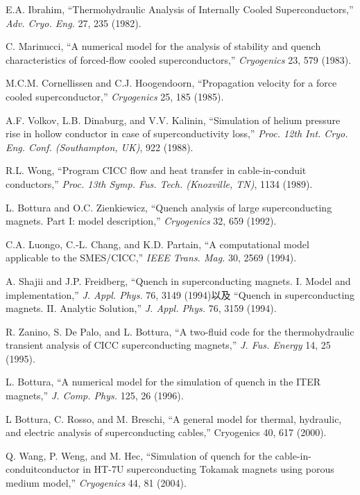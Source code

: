 \noindent [1.9] E.A. Ibrahim, ``Thermohydraulic Analysis of Internally Cooled Superconductors,”
\textit{Adv. Cryo. Eng.} 27, 235 (1982).

\noindent [1.10] C. Marinucci, ``A numerical model for the analysis of stability and quench characteristics of forced-flow cooled superconductors,” \textit{Cryogenics} 23, 579 (1983).

\noindent [1.11] M.C.M. Cornellissen and C.J. Hoogendoorn, ``Propagation velocity for a force
cooled superconductor,” \textit{Cryogenics} 25, 185 (1985).

\noindent [1.12] A.F. Volkov, L.B. Dinaburg, and V.V. Kalinin, ``Simulation of helium pressure
rise in hollow conductor in case of superconductivity loss,” \textit{Proc. 12th Int. Cryo.
Eng. Conf. (Southampton, UK)}, 922 (1988).

\noindent [1.13] R.L. Wong, ``Program CICC flow and heat transfer in cable-in-conduit conductors,”
\textit{Proc. 13th Symp. Fus. Tech. (Knoxville, TN)}, 1134 (1989).

\noindent [1.14] L. Bottura and O.C. Zienkiewicz, ``Quench analysis of large superconducting magnets. Part I: model description,” \textit{Cryogenics} 32, 659 (1992).

\noindent [1.15] C.A. Luongo, C.-L. Chang, and K.D. Partain, ``A computational model applicable
to the SMES/CICC,” \textit{IEEE Trans. Mag.} 30, 2569 (1994).

\noindent [1.16] A. Shajii and J.P. Freidberg, ``Quench in superconducting magnets. I. Model and
implementation,” \textit{J. Appl. Phys.} 76, 3149 (1994)以及 ``Quench in superconducting
magnets. II. Analytic Solution,” \textit{J. Appl. Phys.} 76, 3159 (1994).

\noindent [1.17] R. Zanino, S. De Palo, and L. Bottura, ``A two-fluid code for the thermohydraulic
transient analysis of CICC superconducting magnets,” \textit{J. Fus. Energy} 14,
25 (1995).

\noindent [1.18] L. Bottura, ``A numerical model for the simulation of quench in the ITER magnets,”
\textit{J. Comp. Phys.} 125, 26 (1996).

\noindent [1.19] L Bottura, C. Rosso, and M. Breschi, ``A general model for thermal, hydraulic,
and electric analysis of superconducting cables,” Cryogenics 40, 617 (2000).

\noindent [1.20] Q. Wang, P. Weng, and M. Hec, ``Simulation of quench for the cable-in-conduitconductor in HT-7U superconducting Tokamak magnets using porous medium
model,” \textit{Cryogenics} 44, 81 (2004).

